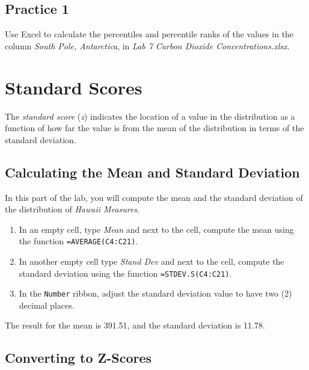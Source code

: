 \documentclass[
]{book}
\providecommand{\tightlist}{%
  \setlength{\itemsep}{0pt}\setlength{\parskip}{0pt}}
\begin{document}
\hypertarget{practice-1-5}{%
\subsection{Practice 1}\label{practice-1-5}}

Use Excel to calculate the percentiles and percentile ranks of the values in the column \emph{South Pole, Antarctica}, in \emph{Lab 7 Carbon Dioxide Concentrations.xlsx}.

\hypertarget{standard-scores}{%
\section{Standard Scores}\label{standard-scores}}

The \emph{standard score} (\emph{z}) indicates the location of a value in the distribution as a function of how far the value is from the mean of the distribution in terms of the standard deviation.

\hypertarget{mean-st-dev}{%
\subsection{Calculating the Mean and Standard Deviation}\label{mean-st-dev}}

In this part of the lab, you will compute the mean and the standard deviation of the distribution of \emph{Hawaii Measures}.

\begin{enumerate}
\def\labelenumi{\arabic{enumi}.}
\tightlist
\item
  In an empty cell, type \emph{Mean} and next to the cell, compute the mean using the function \texttt{=AVERAGE(C4:C21)}.
\item
  In another empty cell type \emph{Stand Dev} and next to the cell, compute the standard deviation using the function \texttt{=STDEV.S(C4:C21)}.
\item
  In the \texttt{Number} ribbon, adjust the standard deviation value to have two (2) decimal places.
\end{enumerate}

The result for the mean is 391.51, and the standard deviation is 11.78.

\hypertarget{converting-to-z-scores}{%
\subsection{Converting to Z-Scores}\label{converting-to-z-scores}}
\end{document}
